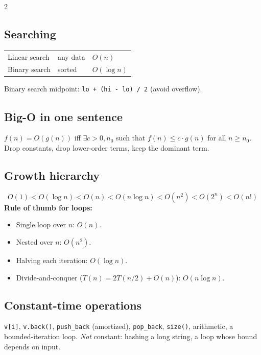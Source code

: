 \documentclass[10pt]{article}
\begin{document}
\begin{multicols}{2}
\subsection*{Searching}
\begin{tabular}{@{}lll@{}}
Linear search & any data     & $O(n)$\\
Binary search & sorted       & $O(\log n)$
\end{tabular}
Binary search midpoint: \texttt{lo + (hi - lo) / 2} (avoid overflow).

\subsection*{Big-O in one sentence}
$f(n) = O(g(n))$ iff $\exists c > 0, n_0$ such that $f(n) \leq c \cdot g(n)$
for all $n \geq n_0$. Drop constants, drop lower-order terms, keep the
dominant term.

\subsection*{Growth hierarchy}
\[
O(1) < O(\log n) < O(n) < O(n \log n) < O(n^2) < O(2^n) < O(n!)
\]
\textbf{Rule of thumb for loops:}
\begin{itemize}
    \item Single loop over $n$: $O(n)$.
    \item Nested over $n$: $O(n^2)$.
    \item Halving each iteration: $O(\log n)$.
    \item Divide-and-conquer ($T(n) = 2T(n/2) + O(n)$): $O(n \log n)$.
\end{itemize}

\subsection*{Constant-time operations}
\texttt{v[i]}, \texttt{v.back()}, \texttt{push\_back} (amortized),
\texttt{pop\_back}, \texttt{size()}, arithmetic, a bounded-iteration
loop. \emph{Not} constant: hashing a long string, a loop whose bound
depends on input.

\columnbreak


\end{multicols}
\end{document}
